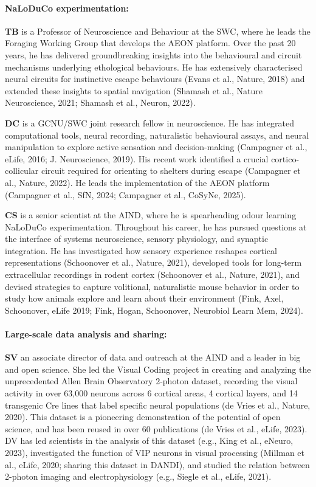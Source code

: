 \paragraph{NaLoDuCo experimentation:} \textbf{TB} is a Professor of
Neuroscience and Behaviour at the SWC, where he leads the Foraging Working
Group that develops the AEON platform.
%
Over the past 20 years, he has delivered groundbreaking insights into the
behavioural and circuit mechanisms underlying ethological behaviours.
%
He has extensively characterised neural circuits for instinctive escape
behaviours (Evans et al., Nature, 2018) and extended these
insights to spatial navigation (Shamash et al., Nature
Neuroscience, 2021; Shamash et al., Neuron, 2022).

\textbf{DC} is a GCNU/SWC joint research fellow in neuroscience. He has
integrated computational tools, neural recording, naturalistic behavioural
assays, and neural manipulation to explore active sensation and decision-making
(Campagner et al., eLife, 2016; J.  Neuroscience, 2019).
%
His recent work identified a crucial cortico-collicular circuit required for
orienting to shelters during escape (Campagner et al., Nature, 2022).
%
He leads the implementation of the AEON platform (Campagner et al., SfN, 2024;
Campagner et al., CoSyNe, 2025).

\textbf{CS} is a senior scientist at the AIND, where he is spearheading odour
learning NaLoDuCo experimentation. Throughout his career, he has pursued
questions at the interface of systems neuroscience, sensory physiology, and
synaptic integration.
%
He has investigated how sensory experience reshapes cortical representations
(Schoonover et al., Nature, 2021),
%
developed tools for long-term extracellular recordings in rodent cortex
(Schoonover et al., Nature, 2021), and
%
devised strategies to capture volitional, naturalistic mouse behavior in order
to study how animals explore and learn about their environment (Fink, Axel,
Schoonover, eLife 2019; Fink, Hogan, Schoonover, Neurobiol Learn Mem, 2024).

\paragraph{Large-scale data analysis and sharing:} \textbf{SV} an
associate director of data and outreach at the AIND and a leader in big and
open science.
%
She led the Visual Coding project in creating and analyzing the unprecedented
Allen Brain Observatory 2-photon dataset, recording the visual activity in over
63,000 neurons across 6 cortical areas, 4 cortical layers, and 14 transgenic
Cre lines that label specific neural populations (de Vries et al., Nature,
2020).
%
This dataset is a pioneering demonstration of the potential of open science,
and has been reused in over 60 publications (de Vries et al., eLife, 2023).
%
DV has led scientists in the analysis of this dataset (e.g., King et al.,
eNeuro, 2023), investigated the function of VIP neurons in visual processing
(Millman et al., eLife, 2020; sharing this dataset in DANDI), and studied the
relation between 2-photon imaging and electrophysiology (e.g., Siegle et al.,
eLife, 2021).

